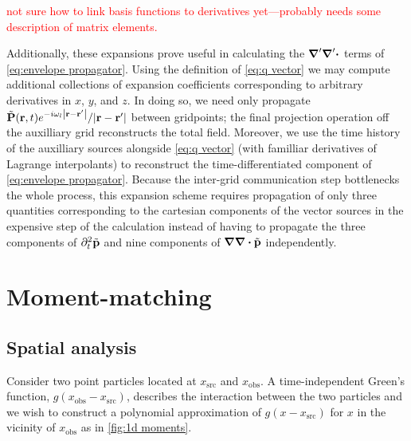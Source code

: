 \textcolor{red}{not sure how to link basis functions to derivatives yet---probably needs some description of matrix elements.}

Additionally, these expansions prove useful in calculating the $\grad' \grad' \boldsymbol{\cdot}$ terms of \cref{eq:envelope propagator}.
Using the definition of \cref{eq:q vector} we may compute additional collections of expansion coefficients corresponding to arbitrary derivatives in $x$, $y$, and $z$.
In doing so, we need only propagate $\tilde{\vb{P}}(\vb{r}, t)e^{-i \omega_l \abs{\vb{r} - \vb{r}'}}/\abs{\vb{r} - \vb{r}'}$ between gridpoints; the final projection operation off the auxilliary grid reconstructs the total field.
Moreover, we use the time history of the auxilliary sources alongside \cref{eq:q vector} (with familliar derivatives of Lagrange interpolants) to reconstruct the time-differentiated component of \cref{eq:envelope propagator}.
Because the inter-grid communication step bottlenecks the whole process, this expansion scheme requires propagation of only three quantities corresponding to the cartesian components of the vector sources in the expensive step of the calculation instead of having to propagate the three components of $\partial_t^2 \tilde{\vb{p}}$ and nine components of $\grad \grad \boldsymbol{\cdot} \tilde{\vb{p}}$ independently.

\section{Moment-matching}

\subsection{Spatial analysis}

Consider two point particles located at $x_\text{src}$ and $x_\text{obs}$. 
A time-independent Green's function, $g(x_\text{obs} - x_\text{src})$, describes the interaction between the two particles and we wish to construct a polynomial approximation of $g(x - x_\text{src})$ for $x$ in the vicinity of $x_\text{obs}$ as in \cref{fig:1d moments}.

